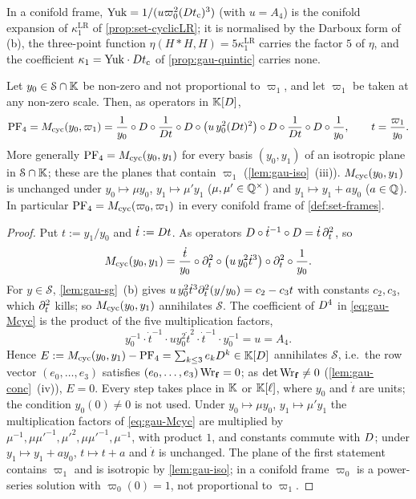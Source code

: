 In a conifold frame, $\mathrm{Yuk}=1/(u\varpi_0^2(Dt_{\mathrm{c}})^3)$ (with $u=A_4$) is the conifold expansion of $\kappa^{\mathrm{LR}}_1$ of \cref{prop:set-cyclicLR}; it is normalised by the Darboux form of (b), the three-point function $\eta(H*H,H)=5\kappa^{\mathrm{LR}}_1$ carries the factor $5$ of $\eta$, and the coefficient $\kappa_1=\mathrm{Yuk}\cdot Dt_{\mathrm{c}}$ of \cref{prop:gau-quintic} carries none.

\begin{thm}
\label{thm:gau-cyc}
Let $y_0\in\mathcal S\cap\mathbb{K}$ be non-zero and not proportional to $\varpi_1$, and let $\varpi_1$ be taken at any non-zero scale. Then, as operators in $\mathbb{K}[D]$,
\begin{equation}
\label{eq:gau-cyc}
\mathrm{PF}_{4}=M_{\mathrm{cyc}}(y_0,\varpi_1)=\frac1{y_0}\circ D\circ\frac1{D t}\circ D\circ\bigl(u\,y_0^2(D t)^2\bigr)\circ D\circ\frac1{D t}\circ D\circ\frac1{y_0},\qquad t=\frac{\varpi_1}{y_0}.
\end{equation}
More generally $\mathrm{PF}_{4}=M_{\mathrm{cyc}}(y_0,y_1)$ for every basis $(y_0,y_1)$ of an isotropic plane in $\mathcal S\cap\mathbb{K}$; these are the planes that contain $\varpi_1$ (\cref{lem:gau-iso}~(iii)). $M_{\mathrm{cyc}}(y_0,y_1)$ is unchanged under $y_0\mapsto\mu y_0$, $y_1\mapsto\mu'y_1$ ($\mu,\mu'\in\mathbb{Q}^\times$) and $y_1\mapsto y_1+ay_0$ ($a\in\mathbb{Q}$). In particular $\mathrm{PF}_{4}=M_{\mathrm{cyc}}(\varpi_0,\varpi_1)$ in every conifold frame of \cref{def:set-frames}.
\end{thm}

\begin{proof}
Put $t:=y_1/y_0$ and $\dot t:=D t$. As operators $D\circ\dot t^{-1}\circ D=\dot t\,\partial_t^2$, so
\[
M_{\mathrm{cyc}}(y_0,y_1)=\frac{\dot t}{y_0}\circ\partial_t^2\circ\bigl(u\,y_0^2\dot t^3\bigr)\circ\partial_t^2\circ\frac1{y_0}.
\]
For $y\in\mathcal S$, \cref{lem:gau-sg}~(b) gives $u\,y_0^2\dot t^3\partial_t^2(y/y_0)=c_2-c_3t$ with constants $c_2,c_3$, which $\partial_t^2$ kills; so $M_{\mathrm{cyc}}(y_0,y_1)$ annihilates $\mathcal S$. The coefficient of $D^4$ in \eqref{eq:gau-Mcyc} is the product of the five multiplication factors,
\[
y_0^{-1}\cdot\dot t^{-1}\cdot uy_0^2\dot t^2\cdot\dot t^{-1}\cdot y_0^{-1}=u=A_4.
\] Hence $E:=M_{\mathrm{cyc}}(y_0,y_1)-\mathrm{PF}_{4}=\sum_{k\leq3}e_kD^k\in\mathbb{K}[D]$ annihilates $\mathcal S$, i.e.\ the row vector $(e_0,\dots,e_3)$ satisfies $(e_0,\dots,e_3)\operatorname{Wr}_{\mathbf f}=0$; as $\det\operatorname{Wr}_{\mathbf f}\neq0$ (\cref{lem:gau-conc}~(iv)), $E=0$. Every step takes place in $\mathbb{K}$ or $\mathbb{K}[\ell]$, where $y_0$ and $\dot t$ are units; the condition $y_0(0)\neq0$ is not used. Under $y_0\mapsto\mu y_0$, $y_1\mapsto\mu'y_1$ the multiplication factors of \eqref{eq:gau-Mcyc} are multiplied by $\mu^{-1},\mu\mu'^{-1},\mu'^2,\mu\mu'^{-1},\mu^{-1}$, with product $1$, and constants commute with $D$; under $y_1\mapsto y_1+ay_0$, $t\mapsto t+a$ and $\dot t$ is unchanged. The plane of the first statement contains $\varpi_1$ and is isotropic by \cref{lem:gau-iso}; in a conifold frame $\varpi_0$ is a power-series solution with $\varpi_0(0)=1$, not proportional to $\varpi_1$.
\end{proof}

